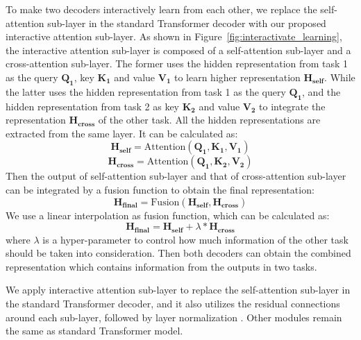 \documentclass[letterpaper]{article} %
\begin{document}
To make two decoders interactively learn from each other, we replace the self-attention sub-layer in the standard Transformer decoder with our proposed interactive attention sub-layer. 
As shown in Figure~\ref{fig:interactivate_learning}, the interactive attention sub-layer is composed of a self-attention sub-layer and a cross-attention sub-layer. The former uses the hidden representation from task 1 as the query $\mathbf{Q_1}$, key $\mathbf{K_1}$ and value $\mathbf{V_1}$ to learn higher representation $\mathbf{H_{self}}$. While the latter uses the hidden representation from task 1 as the query $\mathbf{Q_1}$, and the hidden representation from task 2 as key $\mathbf{K_2}$ and value $\mathbf{V_2}$ to integrate the representation $\mathbf{H_{cross}}$ of the other task. All the hidden representations are extracted from the same layer. It can be calculated as:
\begin{equation}
\mathbf{H_{self}}=\mathrm{Attention(\mathbf{Q_1},\mathbf{K_1},\mathbf{V_1})}
\end{equation}
\begin{equation}
\mathbf{H_{cross}}=\mathrm{Attention(\mathbf{Q_1},\mathbf{K_2},\mathbf{V_2})}
\end{equation}
Then the output of self-attention sub-layer and that of cross-attention sub-layer can be integrated by a fusion function to obtain the final representation:
\begin{equation}
\mathbf{H_{final}}=\mathrm{Fusion(\mathbf{H_{self}},\mathbf{H_{cross}})} 
\end{equation}
We use a linear interpolation as fusion function, which can be calculated as:
\begin{equation}
\mathbf{H_{final}}=\mathbf{H_{self}} + \lambda * \mathbf{H_{cross}}
\end{equation}
where $\lambda$ is a hyper-parameter to control how much information of the other task should be taken into consideration. 
Then both decoders can obtain the combined representation which contains information from the  outputs in two tasks. 

We apply interactive attention sub-layer to replace the self-attention sub-layer in the standard Transformer decoder, and it also utilizes the residual connections \cite{he2016deep} around each sub-layer, followed by layer normalization \cite{ba2016layer}. 
Other modules remain the same as standard Transformer model.
\end{document}

